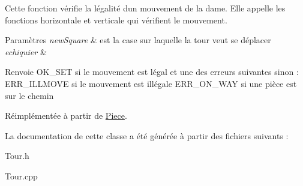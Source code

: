 Cette fonction vérifie la légalité d\textquotesingle{}un mouvement de la dame. Elle appelle les fonctions horizontale et verticale qui vérifient le mouvement. 


\begin{DoxyParams}{Paramètres}
{\em new\+Square} & est la case sur laquelle la tour veut se déplacer \\
\hline
{\em echiquier} & \\
\hline
\end{DoxyParams}
\begin{DoxyReturn}{Renvoie}
O\+K\+\_\+\+S\+ET si le mouvement est légal et une des erreurs suivantes sinon \+: E\+R\+R\+\_\+\+I\+L\+L\+M\+O\+VE si le mouvement est illégale E\+R\+R\+\_\+\+O\+N\+\_\+\+W\+AY si une pièce est sur le chemin 
\end{DoxyReturn}


Réimplémentée à partir de \hyperlink{classPiece_a7003f6b90284237191f00bb6038a3bd3}{Piece}.



La documentation de cette classe a été générée à partir des fichiers suivants \+:\begin{DoxyCompactItemize}
\item 
Tour.\+h\item 
Tour.\+cpp\end{DoxyCompactItemize}
